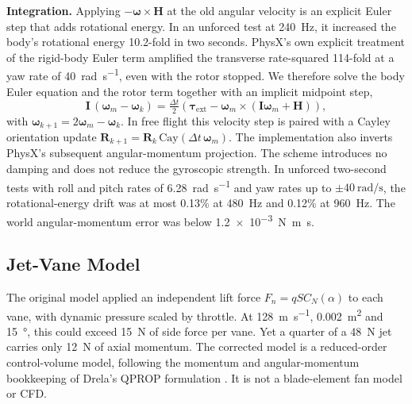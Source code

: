 \documentclass[conference]{IEEEtran}
\begin{document}
\textbf{Integration.} Applying $-\boldsymbol{\omega}\times\mathbf{H}$ at the old angular velocity is an explicit Euler step that adds rotational energy. In an unforced test at \SI{240}{\hertz}, it increased the body's rotational energy 10.2-fold in two seconds. PhysX's own explicit treatment of the rigid-body Euler term amplified the transverse rate-squared 114-fold at a yaw rate of \SI{40}{\radian\per\second}, even with the rotor stopped. We therefore solve the body Euler equation and the rotor term together with an implicit midpoint step,
\begin{equation}
\mathbf{I}\,(\boldsymbol{\omega}_{m} - \boldsymbol{\omega}_{k}) = \tfrac{\Delta t}{2}\left(\boldsymbol{\tau}_{\text{ext}} - \boldsymbol{\omega}_{m} \times (\mathbf{I}\boldsymbol{\omega}_{m} + \mathbf{H})\right),
\label{eq:cayley}
\end{equation}
with $\boldsymbol{\omega}_{k+1} = 2\boldsymbol{\omega}_m - \boldsymbol{\omega}_k$. In free flight this velocity step is paired with a Cayley orientation update $\mathbf{R}_{k+1} = \mathbf{R}_k\,\mathrm{Cay}(\Delta t\,\boldsymbol{\omega}_m)$. The implementation also inverts PhysX's subsequent angular-momentum projection. The scheme introduces no damping and does not reduce the gyroscopic strength. In unforced two-second tests with roll and pitch rates of \SI{6.28}{\radian\per\second} and yaw rates up to $\pm\SI{40}{\radian\per\second}$, the rotational-energy drift was at most 0.13\% at \SI{480}{\hertz} and 0.12\% at \SI{960}{\hertz}. The world angular-momentum error was below \SI{1.2e-3}{\newton\metre\second}.

\subsection{Jet-Vane Model}
\label{sec:vanes}

The original model applied an independent lift force $F_n = q S C_{N}(\alpha)$ to each vane, with dynamic pressure scaled by throttle. At \SI{128}{\metre\per\second}, \SI{0.002}{\metre\squared} and \SI{15}{\degree}, this could exceed \SI{15}{\newton} of side force per vane. Yet a quarter of a \SI{48}{\newton} jet carries only \SI{12}{\newton} of axial momentum. The corrected model is a reduced-order control-volume model, following the momentum and angular-momentum bookkeeping of Drela's QPROP formulation \cite{b26}. It is not a blade-element fan model or CFD.
\end{document}
